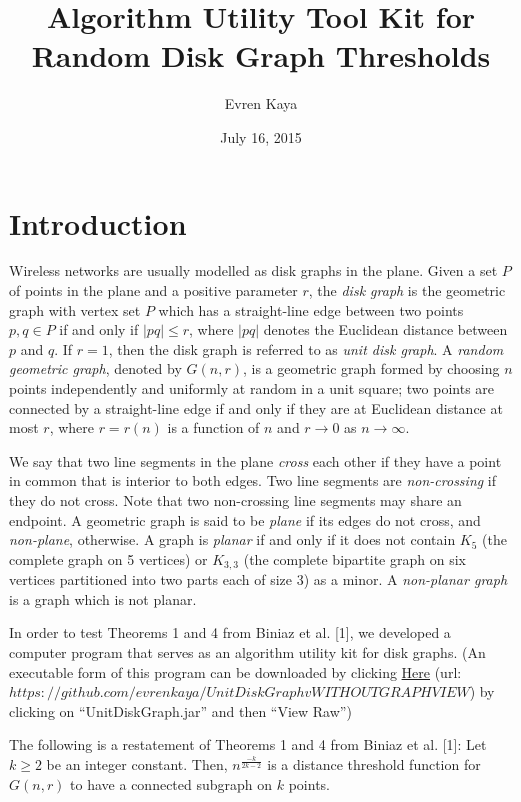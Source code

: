 \documentclass{article}
\title{Algorithm Utility Tool Kit for Random Disk Graph Thresholds}
\author{Evren Kaya}
\date{July 16, 2015}
\newcommand{\dg}{G(n,r)}
\newenvironment{customthm}[1]{\renewcommand\theinnercustomthm{#1}\innercustomthm}{\endinnercustomthm}
\begin{document}
\maketitle

\section{Introduction}
Wireless networks are usually modelled as disk graphs in the plane. Given a set $P$ of points in the plane and a positive parameter $r$, the {\em disk graph} is the geometric graph with vertex set $P$ which has a straight-line edge between two points $p,q\in P$ if and only if $|pq|\le r$, where $|pq|$ denotes the Euclidean distance between $p$ and $q$. If $r=1$, then the disk graph is referred to as {\em unit disk graph}.  
A {\em random geometric graph}, denoted by $\dg$, is a geometric graph formed by choosing $n$ points independently and uniformly at random in a unit square; two points are connected by a straight-line edge if and only if they are at Euclidean distance at most $r$, where $r=r(n)$ is a function of $n$ and $r \to 0$ as $n\to \infty$.

We say that two line segments in the plane {\em cross} each other if they have a point in common that is interior to both edges. Two line segments are {\em non-crossing} if they do not cross. Note that two non-crossing line segments may share an endpoint. A geometric graph is said to be {\em plane} if its edges do not cross, and {\em non-plane}, otherwise. A graph is {\em planar} if and only if it does not contain $K_5$ (the complete graph on 5 vertices) or $K_{3,3}$ (the complete bipartite graph on six vertices partitioned into two parts each of size $3$) as a minor. A {\em non-planar graph} is a graph which is not planar.

In order to test Theorems 1 and 4 from Biniaz et al. [1], we developed a computer program that serves as an algorithm utility kit for disk graphs. (An executable form of this program can be downloaded by clicking \href{https://github.com/evrenkaya/UnitDiskGraphvWITHOUTGRAPHVIEW}{Here} (url: $https://github.com/evrenkaya/UnitDiskGraphvWITHOUTGRAPHVIEW$) by clicking on ``UnitDiskGraph.jar'' and then ``View Raw'')

The following is a restatement of Theorems 1 and 4 from Biniaz et al. [1]:
\begin{customthm}{1}
\label{connected-k-thr}
Let $k\ge 2$ be an integer constant. Then, $n^{\frac{-k}{2k-2}}$ is a distance threshold function for $\dg$ to have a connected subgraph on $k$ points.
\end{customthm}
\end{document}
